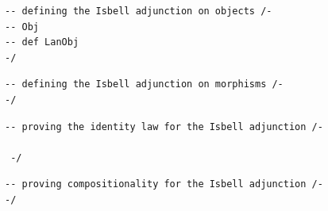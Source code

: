 \documentclass{book}
\theoremstyle{definition}
\newcounter{lcounter}
\begin{document}
\begin{center} \begin{tcolorbox}[width=5in,colback={white},title={\begin{center}\texttt{Lean \thelcounter} \addtocounter{lcounter}{1} \end{center}},colbacktitle=Blue,coltitle=black] \begin{verbatim}
-- defining the Isbell adjunction on objects /-
-- Obj
-- def LanObj
-/
\end{verbatim} \end{tcolorbox} \end{center}
\begin{center} \begin{tcolorbox}[width=5in,colback={white},title={\begin{center}\texttt{Lean \thelcounter} \addtocounter{lcounter}{1} \end{center}},colbacktitle=Blue,coltitle=black] \begin{verbatim}
-- defining the Isbell adjunction on morphisms /-
-/
\end{verbatim} \end{tcolorbox} \end{center}
\begin{center} \begin{tcolorbox}[width=5in,colback={white},title={\begin{center}\texttt{Lean \thelcounter} \addtocounter{lcounter}{1} \end{center}},colbacktitle=Blue,coltitle=black] \begin{verbatim}
-- proving the identity law for the Isbell adjunction /-

 -/
\end{verbatim} \end{tcolorbox} \end{center}
\begin{center} \begin{tcolorbox}[width=5in,colback={white},title={\begin{center}\texttt{Lean \thelcounter} \addtocounter{lcounter}{1} \end{center}},colbacktitle=Blue,coltitle=black] \begin{verbatim}
-- proving compositionality for the Isbell adjunction /-
-/
\end{verbatim} \end{tcolorbox} \end{center}
\end{document}
